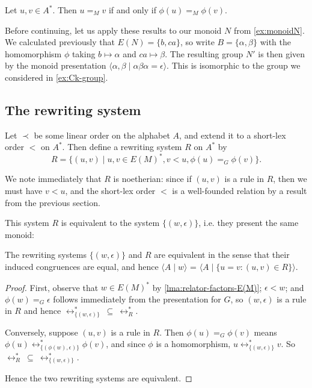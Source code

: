 \documentclass[noindex,noinsetproof,12pt]{lmaths}
\begin{document}
\begin{prop}
	Let $u, v \in A^*$. Then $u =_M v$ if and only if $\phi(u) =_M \phi(v)$.
\end{prop}

Before continuing, let us apply these results to our monoid $N$ from \cref{ex:monoidN}. We calculated previously that $E(N) = \{b, ca\}$, so write $B = \{\alpha, \beta\}$ with the homomorphism $\phi$ taking $b \mapsto \alpha$ and $ca \mapsto \beta$. The resulting group $N'$ is then given by the monoid presentation $\langle \alpha, \beta \mid \alpha\beta\alpha = \epsilon \rangle$. This is isomorphic to the group we considered in \cref{ex:Ck-group}.

\subsection{The rewriting system}

Let $\prec$ be some linear order on the alphabet $A$, and extend it to a short-lex order $<$ on $A^*$. Then define a rewriting system $R$ on $A^*$ by
	\[ R = \{ (u, v) \mid u, v \in E(M)^*, v < u, \phi(u) =_G \phi(v) \}. \]

We note immediately that $R$ is noetherian: since if $(u, v)$ is a rule in $R$, then we must have $v < u$, and the short-lex order $<$ is a well-founded relation by a result from the previous section.

This system $R$ is equivalent to the system $\{(w, \epsilon)\}$, i.e. they present the same monoid:
\begin{lemma} \label{lma:R-equivalent-to-pres}
	The rewriting systems $\{(w, \epsilon)\}$ and $R$ are equivalent in the sense that their induced congruences  are equal, and hence $\langle A \mid w \rangle$ = $\langle A \mid \{u = v : (u, v) \in R\}\rangle$.
\end{lemma}
\begin{proof}
	First, observe that $w \in E(M)^*$ by \cref{lma:relator-factors-E(M)}; $\epsilon < w$; and $\phi(w) =_G \epsilon$ follows immediately from the presentation for $G$, so $(w, \epsilon)$ is a rule in $R$ and hence $\leftrightarrow^*_{\{(w,\epsilon)\}}\ \subseteq\ \leftrightarrow^*_R$.

Conversely, suppose $(u, v)$ is a rule in $R$. Then $\phi(u) =_G \phi(v)$ means $\phi(u) \leftrightarrow^*_{\{(\phi(w), \epsilon)\}} \phi(v)$, and since $\phi$ is a homomorphism, $u \leftrightarrow^*_{\{(w, \epsilon)\}} v$. So $\leftrightarrow^*_R\ \subseteq\ \leftrightarrow^*_{\{(w,\epsilon)\}}$.

Hence the two rewriting systems are equivalent.
\end{proof}
\end{document}
